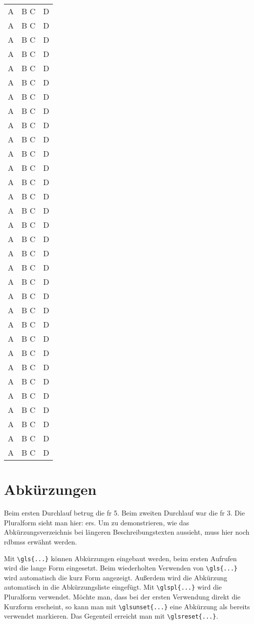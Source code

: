 \begin{longtable}{|l|l|l|}
A & B C & D \\
A & B C & D \\
A & B C & D \\
A & B C & D \\
A & B C & D \\
A & B C & D \\
A & B C & D \\
A & B C & D \\
A & B C & D \\
A & B C & D \\
A & B C & D \\
A & B C & D \\
A & B C & D \\
A & B C & D \\
A & B C & D \\
A & B C & D \\
A & B C & D \\
A & B C & D \\
A & B C & D \\
A & B C & D \\
A & B C & D \\
A & B C & D \\
A & B C & D \\
A & B C & D \\
A & B C & D \\
A & B C & D \\
A & B C & D \\
A & B C & D \\
A & B C & D \\
A & B C & D \\
A & B C & D \\
A & B C & D \\
\end{longtable}


\section{Abkürzungen}

Beim ersten Durchlauf betrug die \gls{fr} 5.
Beim zweiten Durchlauf war die \gls{fr} 3.
Die Pluralform sieht man hier: \glspl{er}.
Um zu demonstrieren, wie das Abkürzungsverzeichnis bei längeren Beschreibungstexten aussieht, muss hier noch \glspl{rdbms} erwähnt werden.

Mit \verb+\gls{...}+ können Abkürzungen eingebaut werden, beim ersten Aufrufen wird die lange Form eingesetzt.
Beim wiederholten Verwenden von \verb+\gls{...}+ wird automatisch die kurz Form angezeigt.
Außerdem wird die Abkürzung automatisch in die Abkürzungsliste eingefügt.
Mit \verb+\glspl{...}+ wird die Pluralform verwendet.
Möchte man, dass bei der ersten Verwendung direkt die Kurzform erscheint, so kann man mit \verb+\glsunset{...}+ eine Abkürzung als bereits verwendet markieren.
Das Gegenteil erreicht man mit \verb+\glsreset{...}+.

